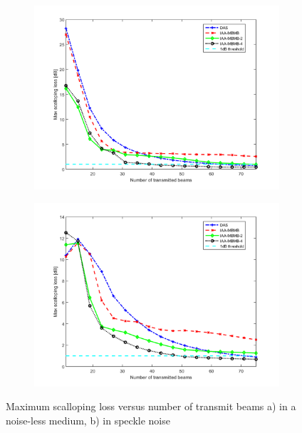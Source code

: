 \begin{figure}[ht]
    \centering
    \begin{subfigure}[t]{0.48\linewidth}
        \includegraphics[width=\linewidth]{./images/discussion/loss_vs_beams_upsample.png}
    \end{subfigure}
    \quad
    \begin{subfigure}[t]{0.48\linewidth}
        \includegraphics[width=\linewidth]{./images/discussion/loss_vs_beams_speckle_upsample.png}
    \end{subfigure}
	\caption{Maximum scalloping loss versus number of transmit beams a) in a noise-less medium, b) in speckle noise}
	\label{fig:loss_vs_beams_upsample}
\end{figure}

